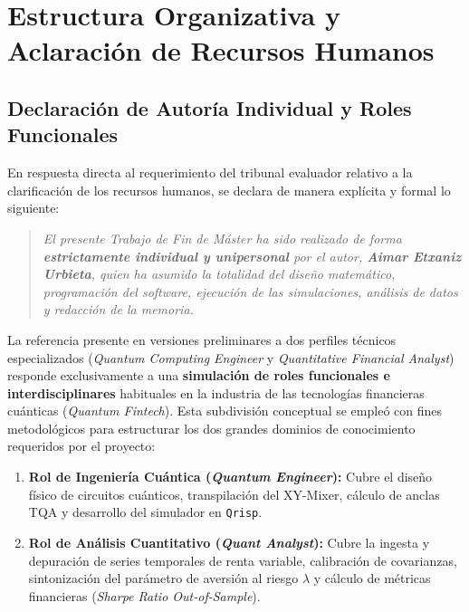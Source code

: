 \section{Estructura Organizativa y Aclaración de Recursos Humanos}
\label{sec:organizacion_rrhh}

\subsection{Declaración de Autoría Individual y Roles Funcionales}
\label{subsec:autoria_roles}

En respuesta directa al requerimiento del tribunal evaluador relativo a la clarificación de los recursos humanos, se declara de manera explícita y formal lo siguiente:

\begin{quote}
\textit{El presente Trabajo de Fin de Máster ha sido realizado de forma \textbf{estrictamente individual y unipersonal} por el autor, \textbf{Aimar Etxaniz Urbieta}, quien ha asumido la totalidad del diseño matemático, programación del software, ejecución de las simulaciones, análisis de datos y redacción de la memoria.}
\end{quote}

La referencia presente en versiones preliminares a dos perfiles técnicos especializados (\textit{Quantum Computing Engineer} y \textit{Quantitative Financial Analyst}) responde exclusivamente a una \textbf{simulación de roles funcionales e interdisciplinares} habituales en la industria de las tecnologías financieras cuánticas (\textit{Quantum Fintech}). Esta subdivisión conceptual se empleó con fines metodológicos para estructurar los dos grandes dominios de conocimiento requeridos por el proyecto:
\begin{enumerate}
    \item \textbf{Rol de Ingeniería Cuántica (\textit{Quantum Engineer}):} Cubre el diseño físico de circuitos cuánticos, transpilación del XY-Mixer, cálculo de anclas TQA y desarrollo del simulador en \texttt{Qrisp}.
    \item \textbf{Rol de Análisis Cuantitativo (\textit{Quant Analyst}):} Cubre la ingesta y depuración de series temporales de renta variable, calibración de covarianzas, sintonización del parámetro de aversión al riesgo $\lambda$ y cálculo de métricas financieras (\textit{Sharpe Ratio Out-of-Sample}).
\end{enumerate}

